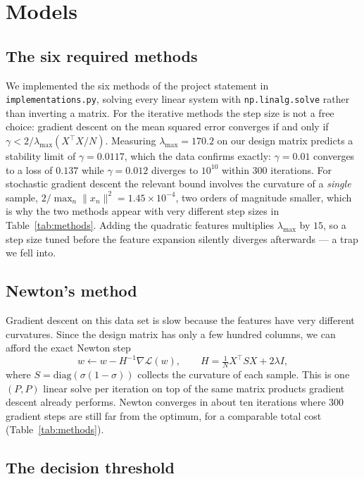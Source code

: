 \documentclass[10pt,conference,compsocconf]{IEEEtran}
\begin{document}
\section{Models}

\subsection{The six required methods}

We implemented the six methods of the project statement in
\texttt{implementations.py}, solving every linear system with
\texttt{np.linalg.solve} rather than inverting a matrix. For the iterative
methods the step size is not a free choice: gradient descent on the mean
squared error converges if and only if $\gamma < 2/\lambda_{\max}(X^\top X/N)$.
Measuring $\lambda_{\max} = 170.2$ on our design matrix predicts a stability
limit of $\gamma = 0.0117$, which the data confirms exactly: $\gamma = 0.01$
converges to a loss of $0.137$ while $\gamma = 0.012$ diverges to $10^{10}$
within 300 iterations. For stochastic gradient descent the relevant bound
involves the curvature of a \emph{single} sample,
$2/\max_n \lVert x_n \rVert^2 = 1.45 \times 10^{-4}$, two orders of magnitude
smaller, which is why the two methods appear with very different step sizes in
Table~\ref{tab:methods}. Adding the quadratic features multiplies
$\lambda_{\max}$ by $15$, so a step size tuned before the feature expansion
silently diverges afterwards --- a trap we fell into.

\subsection{Newton's method}

Gradient descent on this data set is slow because the features have very
different curvatures. Since the design matrix has only a few hundred columns,
we can afford the exact Newton step
\[
  w \leftarrow w - H^{-1} \nabla \mathcal{L}(w),
  \qquad
  H = \tfrac{1}{N} X^\top S X + 2\lambda I,
\]
where $S = \mathrm{diag}\left(\sigma(1-\sigma)\right)$ collects the curvature
of each sample. This is one $(P,P)$ linear solve per iteration on top of the same matrix
products gradient descent already performs. Newton converges in about ten
iterations where 300 gradient steps are still far from the optimum, for a
comparable total cost (Table~\ref{tab:methods}).

\subsection{The decision threshold}
\end{document}
